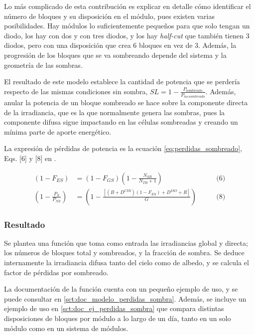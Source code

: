 Lo más complicado de esta contribución es explicar en detalle cómo identificar el número de bloques y su disposición en el módulo, pues existen varias posibilidades. Hay módulos lo suficientemente pequeños para que solo tengan un diodo, los hay con dos y con tres diodos, y los hay \textit{half-cut} que también tienen 3 diodos, pero con una disposición que crea 6 bloques en vez de 3. Además, la progresión de los bloques que se va sombreando depende del sistema y la geometría de las sombras.

El resultado de este modelo establece la cantidad de potencia que se perdería respecto de las mismas condiciones sin sombra, $SL = 1 - \frac{P_\text{sombreado}}{P_{no\,sombreado}}$. Además, anular la potencia de un bloque sombreado se hace sobre la componente directa de la irradiancia, que es la que normalmente genera las sombras, pues la componente difusa sigue impactando en las células sombreadas y creando un mínima parte de aporte energético.

La expresión de pérdidas de potencia es la ecuación \ref{eq:perdidas_sombreado}, Eqs. [6] y [8] en \cite{Martínez-Moreno_Muñoz_Lorenzo_2010}.

\begin{equation} \label{eq:perdidas_sombreado}
    \begin{alignedat}{3}
        (1 - F_{ES}) &= (1 - F_{GS}) \left(1 - \frac{N_{SB}}{N_{TB} + 1}\right) \qquad &\text{(6)}\\
        \left(1 - \frac{P_{S}}{P_{NS}}\right) &= \left(1 - \frac{\left[(B + D^{CIR})(1 - F_{ES}) + D^{ISO} + R\right]}{G}\right) \qquad &\text{(8)}
    \end{alignedat}
\end{equation}

\subsubsection{Resultado}

Se plantea una función que toma como entrada las irradiancias global y directa; los números de bloques total y sombreados, y la fracción de sombra. Se deduce internamente la irradiancia difusa tanto del cielo como de albedo, y se calcula el factor de pérdidas por sombreado.

La documentación de la función cuenta con un pequeño ejemplo de uso, y se puede consultar en \ref{sct:doc_modelo_perdidas_sombra}. Además, se incluye un ejemplo de uso en \ref{sct:doc_ej_perdidas_sombra} que compara distintas disposiciones de bloques por módulo a lo largo de un día, tanto en un solo módulo como en un sistema de módulos.

